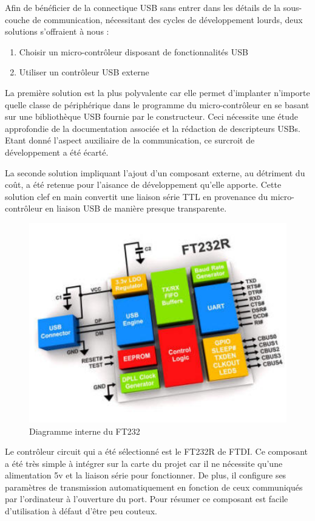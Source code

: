 \documentclass[11pt, french]{article} %
\begin{document}
	Afin de bénéficier de la connectique USB sans entrer dans les détails de la sous-couche de communication, nécessitant des cycles de développement lourds, deux solutions s'offraient à nous :

\medskip
\begin{enumerate}
	\item Choisir un micro-contrôleur disposant de fonctionnalités USB
	\item Utiliser un contrôleur USB externe
\end{enumerate}

\medskip
La première solution est la plus polyvalente car elle permet d'implanter n'importe quelle classe de périphérique dans le programme du micro-contrôleur en se basant sur une bibliothèque USB fournie par le constructeur. Ceci nécessite une étude approfondie de la documentation associée et la rédaction de descripteurs USBs. Etant donné l'aspect auxiliaire de la communication, ce surcroit de développement a été écarté.

La seconde solution impliquant l'ajout d'un composant externe, au détriment du coût, a été retenue pour l'aisance de développement qu'elle apporte. Cette solution clef en main convertit une liaison série TTL en provenance du micro-contrôleur en liaison USB de manière presque transparente.

\begin{figure}[h!]
	\centering
	\includegraphics[width = 12cm]{SolutionNumerique/diagrammeFT232.jpg} 
	\caption{Diagramme interne du FT232}
\end{figure}

Le contrôleur circuit qui a été sélectionné est le FT232R de FTDI. Ce composant a été très simple à intégrer sur la carte du projet car il ne nécessite qu'une alimentation 5v et la liaison série pour fonctionner. De plus, il configure ses paramètres de transmission automatiquement en fonction de ceux communiqués par l'ordinateur à l'ouverture du port. Pour résumer ce composant est facile d'utilisation à défaut d'être peu couteux.
\end{document}
